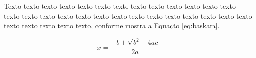     Texto texto texto texto texto texto texto texto texto texto texto texto texto texto texto texto texto texto texto texto texto texto texto texto texto texto texto texto texto texto texto texto, conforme mostra a Equação \ref{eq:baskara}.
    
\begin{equation} \label{eq:baskara}
  x=\frac{-b\pm\sqrt{b^2-4ac}}{2a}
\end{equation} 

